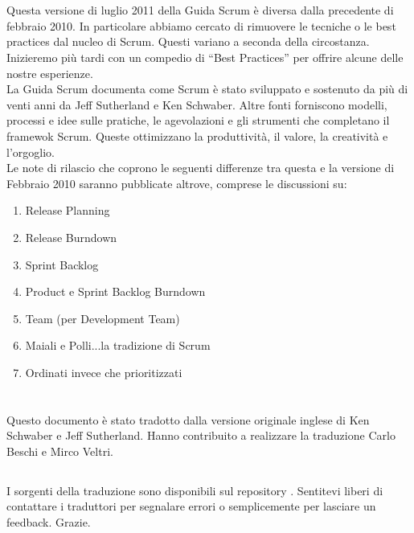 \newpage
\section*{\color{Blue}{Revisioni}}
\label{sec:revisions}
Questa versione di luglio 2011 della Guida Scrum è diversa dalla precedente di febbraio 2010. In particolare abbiamo cercato di rimuovere le 
tecniche o le best practices dal nucleo di Scrum. Questi variano a seconda della circostanza. Inizieremo pi\`u tardi con un compedio di 
``Best Practices'' per offrire alcune delle nostre esperienze.
\newline
\\La Guida Scrum documenta come Scrum \`e stato sviluppato e sostenuto da pi\`u di venti anni da Jeff Sutherland e Ken Schwaber. Altre fonti 
forniscono modelli, processi e idee sulle pratiche, le agevolazioni e gli strumenti che completano il framewok Scrum. Queste ottimizzano la 
produttività, il valore, la creatività e l'orgoglio.
\newline
\\Le note di rilascio che coprono le seguenti differenze tra questa e la versione di Febbraio 2010 saranno pubblicate altrove, comprese le 
discussioni su:

\begin{enumerate}
 	\item Release Planning
	\item Release Burndown
	\item Sprint Backlog
	\item Product e Sprint Backlog Burndown
	\item Team (per Development Team)
	\item Maiali e Polli...la tradizione di Scrum
	\item Ordinati invece che prioritizzati 
\end{enumerate}

\newpage
\section*{\color{Blue}{Traduzione}}
\label{sec:translation}
Questo documento \`e stato tradotto dalla versione originale inglese di Ken Schwaber e Jeff Sutherland. Hanno contribuito a realizzare la 
traduzione Carlo Beschi e Mirco Veltri.

\subsection*{\color{SteelBlue}{Note alla versione italiana}}
\label{sec:transnotes}
I sorgenti della traduzione sono disponibili sul repository . 
Sentitevi liberi di contattare i traduttori per segnalare errori o semplicemente per lasciare un feedback. Grazie.